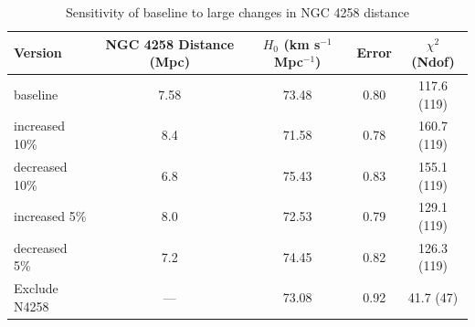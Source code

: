 \begin{table}[h!]
\centering
\caption{Sensitivity of baseline to large changes in NGC 4258 distance}
\begin{tabular}{lcccc}
\hline
\textbf{Version} & \textbf{NGC 4258 Distance (Mpc)} & \textbf{$H_0$ (km s$^{-1}$ Mpc$^{-1}$)} & \textbf{Error} & \textbf{$\chi^2$} (Ndof) \\
\hline
baseline & 7.58 & 73.48 & 0.80 & 117.6 (119) \\
\hline
increased 10\% & 8.4 & 71.58 & 0.78 & 160.7 (119) \\
decreased 10\% & 6.8 & 75.43 & 0.83 & 155.1 (119) \\
increased 5\% & 8.0 & 72.53 & 0.79 & 129.1 (119) \\
decreased 5\% & 7.2 & 74.45 & 0.82 & 126.3 (119) \\
\hline
Exclude N4258 & --- & 73.08 & 0.92 & 41.7 (47)  \\
\hline
\end{tabular}
 \label{tab:N4258_sens}
\end{table}
